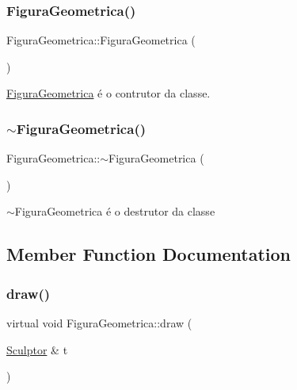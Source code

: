 \subsubsection{\texorpdfstring{Figura\+Geometrica()}{FiguraGeometrica()}}
{\footnotesize\ttfamily Figura\+Geometrica\+::\+Figura\+Geometrica (\begin{DoxyParamCaption}{ }\end{DoxyParamCaption})}



\hyperlink{class_figura_geometrica}{Figura\+Geometrica} é o contrutor da classe. 

\mbox{\label{class_figura_geometrica_ad13b9bccf1b14f6b9fbc662aad61ffd1}} 
\subsubsection{\texorpdfstring{$\sim$\+Figura\+Geometrica()}{~FiguraGeometrica()}}
{\footnotesize\ttfamily Figura\+Geometrica\+::$\sim$\+Figura\+Geometrica (\begin{DoxyParamCaption}{ }\end{DoxyParamCaption})\hspace{0.3cm}{\ttfamily [virtual]}}



$\sim$\+Figura\+Geometrica é o destrutor da classe 



\subsection{Member Function Documentation}
\mbox{\label{class_figura_geometrica_a34585fd7c0bd7378fc69c4ee208e676c}} 
\subsubsection{\texorpdfstring{draw()}{draw()}}
{\footnotesize\ttfamily virtual void Figura\+Geometrica\+::draw (\begin{DoxyParamCaption}\item[{\hyperlink{class_sculptor}{Sculptor} \&}]{t }\end{DoxyParamCaption})\hspace{0.3cm}{\ttfamily [pure virtual]}}



